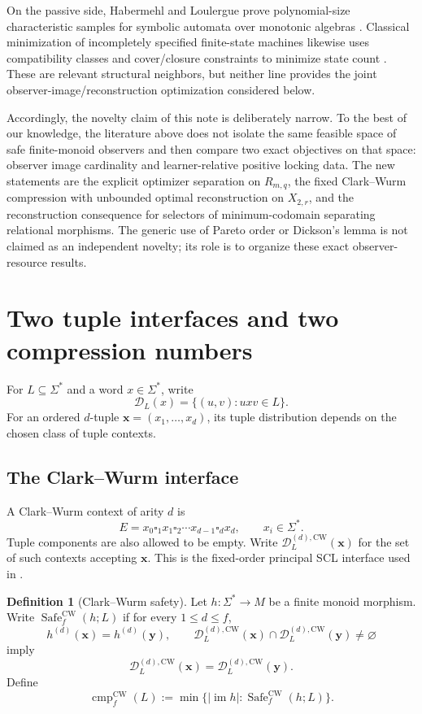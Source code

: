 \documentclass[11pt]{article}
\theoremstyle{definition}
\newtheorem{definition}[theorem]{Definition}
\theoremstyle{remark}
\newcommand{\D}{\mathcal D}
\newcommand{\im}{\operatorname{im}}
\newcommand{\cmp}{\operatorname{cmp}}
\newcommand{\Safe}{\operatorname{Safe}}
\newcommand{\blank}{\square}
\begin{document}
On the passive side, Habermehl and Loulergue prove polynomial-size
characteristic samples for symbolic automata over monotonic algebras
\cite{HabermehlLoulergue2026}.  Classical minimization of incompletely
specified finite-state machines likewise uses compatibility classes and
cover/closure constraints to minimize state count
\cite{PaullUnger1959,GrasselliLuccio1965}.  These are relevant structural
neighbors, but neither line provides the joint observer-image/reconstruction
optimization considered below.

Accordingly, the novelty claim of this note is deliberately narrow.  To the
best of our knowledge, the literature above does not isolate the same feasible
space of safe finite-monoid observers and then compare two exact objectives on
that space: observer image cardinality and learner-relative positive locking
data.  The new statements are the explicit optimizer separation on
$R_{m,q}$, the fixed Clark--Wurm compression with unbounded optimal
reconstruction on $X_{2,r}$, and the reconstruction consequence for selectors
of minimum-codomain separating relational morphisms.  The generic use of
Pareto order or Dickson's lemma is not claimed as an independent novelty; its
role is to organize these exact observer-resource results.

\section{Two tuple interfaces and two compression numbers}
\label{sec:interfaces}

For $L\subseteq\Sigma^*$ and a word $x\in\Sigma^*$, write
\[
 \D_L(x)=\{(u,v):uxv\in L\}.
\]
For an ordered $d$-tuple $\mathbf x=(x_1,\ldots,x_d)$, its tuple distribution
depends on the chosen class of tuple contexts.

\subsection{The Clark--Wurm interface}

A Clark--Wurm context of arity $d$ is
\[
 E=x_0\blank_1x_1\blank_2\cdots x_{d-1}\blank_dx_d,
 \qquad x_i\in\Sigma^*.
\]
Tuple components are also allowed to be empty.  Write
$\D^{(d),\mathrm{CW}}_L(\mathbf x)$ for the set of such contexts accepting
$\mathbf x$.  This is the fixed-order principal SCL interface used in
\cite{KuriyamaSCL}.

\begin{definition}[Clark--Wurm safety]
Let $h:\Sigma^*\to M$ be a finite monoid morphism.  Write
$\Safe_f^{\mathrm{CW}}(h;L)$ if for every $1\le d\le f$,
\[
 h^{(d)}(\mathbf x)=h^{(d)}(\mathbf y),\qquad
 \D_L^{(d),\mathrm{CW}}(\mathbf x)\cap
 \D_L^{(d),\mathrm{CW}}(\mathbf y)\ne\varnothing
\]
imply
\[
 \D_L^{(d),\mathrm{CW}}(\mathbf x)
 =
 \D_L^{(d),\mathrm{CW}}(\mathbf y).
\]
Define
\[
 \cmp_f^{\mathrm{CW}}(L)
 :=
 \min\{|\im h|:\Safe_f^{\mathrm{CW}}(h;L)\}.
\]
\end{definition}
\end{document}
